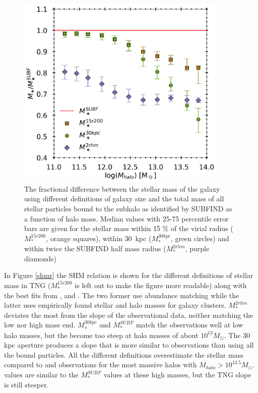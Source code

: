 \begin{figure}
    \centering
    \includegraphics[width=0.9\textwidth]{images/HM_fSM.png}
    \caption{The fractional difference between the stellar mass of the galaxy using different definitions of galaxy size and the total mass of all stellar particles bound to the subhalo as identified by SUBFIND as a function of halo mass. Median values with 25-75 percentile error bars are given for the stellar mass within 15 \% of the virial radius ($M_\ast^{15r200}$, orange squares), within 30$\,$ kpc ($M_\ast^{30kpc}$, green circles) and within twice the SUBFIND half mass radius ($M_\ast^{2rhm}$, purple diamonds)}
    \label{HM_fSM}
\end{figure}


In Figure \ref{shmr} the SHM relation is shown for the different definitions of stellar mass in TNG ($M_\ast^{15r200}$ is left out to make the figure more readable) along with the best fits from \textcite{Behroozi2019}, \textcite{Zanisi2019} and \textcite{Kravtsov2018}. The two former use abundance matching while the latter uses empirically found stellar and halo masses for galaxy clusters. $M_\ast^{2rhm}$ deviates the most from the slope of the observational data, neither matching the low nor high mass end. $M_\ast^{30kpc}$ and $M^{SUBF}_\ast$ match the observations well at low halo masses, but the become too steep at halo masses of about $10^{13} M_\odot$. The 30 kpc aperture produces a slope that is more similar to observations than using all the bound particles. All the different definitions overestimate the stellar mass compared to \textcite{Behroozi2019} and \textcite{Zanisi2019} observations for the most massive halos with $M_{halo} > 10^{13.5} M_\odot$. \textcite{Kravtsov2018} values are similar to the $M^{SUBF}_\ast$ values at these high masses, but the TNG slope is still steeper. 

